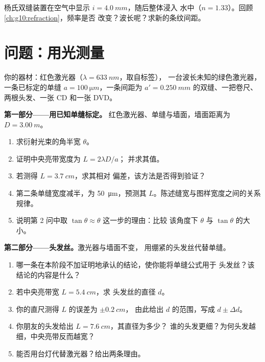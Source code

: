 \begin{exercise}[$\star\star\star$]\label{exo:g12:light-as-wave:15}
杨氏双缝装置在空气中显示 $i = \qty{4.0}{mm}$，随后整体浸入
水中（$n = 1.33$）。回顾\cref{ch:g10:refraction}，频率是否
改变？波长呢？求新的条纹间距。
\end{exercise}

\section{问题：用光测量}

\begin{problem}
\label{pb:g12:light-as-wave:1}
你的器材：红色激光器（$\lambda = \qty{633}{nm}$，取自标签），
一台波长未知的绿色激光器，一条已标定的单缝
$a = \qty{100}{\micro m}$，一条间距为 $a' =
\qty{0.250}{mm}$ 的双缝、一把卷尺、两根头发、一张 CD 和一张 DVD。

\medskip
\noindent\textbf{第一部分——用已知单缝标定。}
红色激光器、单缝与墙面，墙面距离为 $D = \qty{3.00}{m}$。
\begin{enumerate}
  \item 求衍射光束的角半宽 $\theta$。
  \item 证明中央亮带宽度为 $L = 2\lambda D/a$；
        并求其值。
  \item 若测得 $L = \qty{3.7}{cm}$，求其相对
        偏差，该方法是否得到验证？
  \item 第二条单缝宽度减半，为 \qty{50}{\micro m}，预测其
        $L$。陈述缝宽与图样宽度之间的关系规律。
  \item 说明第 2 问中取 $\tan\theta \approx \theta$ 这一步的理由：比较
        该角度下 $\theta$ 与 $\tan\theta$ 的大小。
\end{enumerate}

\medskip
\noindent\textbf{第二部分——头发丝。}激光器与墙面不变，
用绷紧的头发丝代替单缝。
\begin{enumerate}[resume]
  \item 哪一条在本阶段不加证明地承认的结论，使你能将单缝公式用于
        头发丝？该结论的内容是什么？
  \item 若中央亮带宽 $L = \qty{5.4}{cm}$，求
        头发丝的直径 $d$。
  \item 你的直尺测得 $L$ 的误差为 $\pm\qty{0.2}{cm}$，
        由此给出 $d$ 的范围，写成 $d \pm \Delta d$。
  \item 你朋友的头发给出 $L = \qty{7.6}{cm}$，其直径为多少？
        谁的头发更细？为何头发越细，中央亮带反而越宽？
  \item 能否用台灯代替激光器？给出两条理由。
\end{enumerate}


\end{problem}
